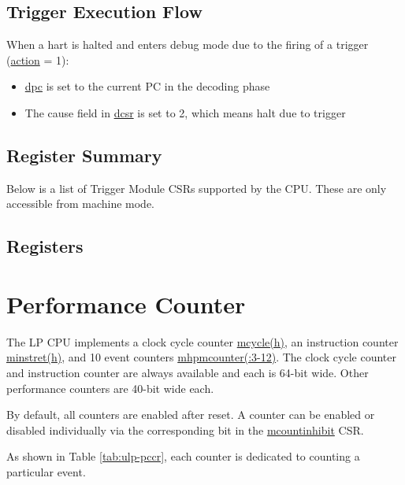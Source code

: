 \documentclass[main\_\_EN.tex]{subfiles}
\begin{document}
\subsection{Trigger Execution Flow}
\label{sec:ulp-hwt-suggest-op}

When a hart is halted and enters debug mode due to the firing of a trigger (\hyperref[fielddesc:LPMCONTROLACTION]{action} = 1):
\begin{itemize}
    \item \hyperref[regdesc:LPDPC]{dpc} is set to the current PC in the decoding phase
    \item The cause field in \hyperref[regdesc:LPDCSR]{dcsr} is set to 2, which means halt due to trigger
\end{itemize}


\subsection{Register Summary}
Below is a list of Trigger Module CSRs supported by the CPU. These are only accessible from machine mode.



\subsection{Registers}



\section{Performance Counter}

The LP CPU implements a clock cycle counter \hyperref[regdesc:LPMCYCLE]{mcycle(h)}, an instruction counter \hyperref[regdesc:LPMINSTRET]{minstret(h)}, and 10 event counters \hyperref[regdesc:LPMHPMCOUNTER]{mhpmcounter(:3-12)}. The clock cycle counter and instruction counter are always available and each is 64-bit wide. Other performance counters are 40-bit wide each.

By default, all counters are enabled after reset. A counter can be enabled or disabled individually via the corresponding bit in the \hyperref[regdesc:LPMCOUNTINHIBIT]{mcountinhibit} CSR.

As shown in Table \ref{tab:ulp-pccr}, each counter is dedicated to counting a particular event.
\end{document}
